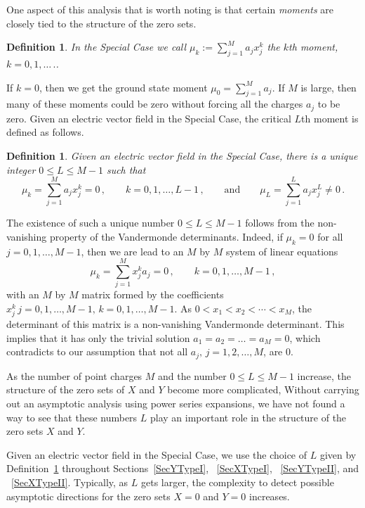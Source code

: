 \documentclass{article}
\newtheorem{defn}[thm]{\bf Definition}
\theoremstyle{remark}
\numberwithin{equation}{section}
\begin{document}
One aspect of this analysis that is worth noting is that certain {\em moments} are closely tied to the structure of the zero sets.

\begin{defn}\label{intromoments}
In the Special Case we call $\mu_k:=\sum\limits_{j=1}^M{a_jx_j^k}$ the $k$th {\em moment}, $k=0,1,\ldots\,.$. 
\end{defn}

If $k=0$, then we get the ground state moment $\mu_0 = \sum\limits_{j=1}^M{a_j}$. If $M$ is large,
then many of these moments could be zero without forcing all the charges $a_j$ to be zero.  Given an electric vector field in the Special Case, the critical $L$th moment 
is defined as follows. 

\begin{defn}\label{L} Given an electric vector field in the Special Case, there is a unique integer $0 \leq L \leq M-1$  such that 
$$\mu_k = \sum\limits_{j=1}^M{a_jx_j^k} = 0\,, \qquad k=0,1,\ldots,L-1\,, \qquad \text{and} \qquad \mu_L = \sum\limits_{j=1}^L{a_jx_j^L} \neq 0\,.$$ 
\end{defn}

\noindent The existence of such a unique number $0 \leq L \leq M-1$ follows from the non-vanishing property of the Vandermonde determinants. Indeed, if 
$\mu_k=0$ for all $j=0,1,\ldots,M-1$, then we are lead to an $M$ by $M$ system of linear equations 
$$\mu_k = \sum\limits_{j=1}^M{x_j^ka_j} = 0\,, \qquad k=0,1,\ldots,M-1\,,$$  
with an $M$ by $M$ matrix formed by the coefficients $x_j^k \, j=0,1,\ldots,M-1, \, k=0,1,\ldots,M-1$. As $0 < x_1 < x_2 < \cdots < x_M$, the 
determinant of this matrix is a non-vanishing Vandermonde determinant. This implies that it has only the trivial solution $a_1=a_2=\ldots=a_M=0$, 
which contradicts to our assumption that not all $a_j, \, j=1,2,\ldots,M$, are $0$.

As the number of point charges $M$ and the number $0 \leq L \leq M-1$ increase, the structure of the zero sets of $X$ and $Y$ become more complicated,
Without carrying out an asymptotic analysis using power series expansions,
we have not found a way to see that these numbers $L$ play an important role in the structure of the zero sets $X$ and $Y$.

Given an electric vector field in the Special Case, we use the choice of $L$ given by Definition~\ref{L} throughout Sections~\ref{SecYTypeI}, ~\ref{SecXTypeI}, ~\ref{SecYTypeII}, 
and ~\ref{SecXTypeII}. Typically, as $L$ gets larger, the complexity to detect possible asymptotic directions for the zero sets $X=0$ and $Y=0$ increases.
\end{document}

